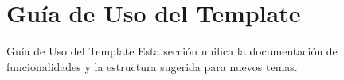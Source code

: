 \section{Guía de Uso del Template}
\label{sec:usage_guide}

\begin{frame}{Guía de Uso del Template}
    Esta sección unifica la documentación de funcionalidades y la estructura
    sugerida para nuevos temas.
\end{frame}







